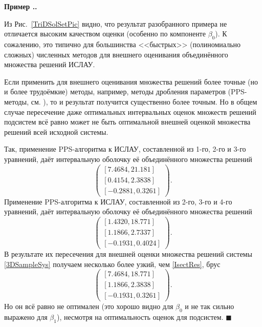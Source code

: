 \documentclass[a5paper,openany]{book}
\newcounter{ExmpNum}[section]
\renewcommand{\theExmpNum}{\thesection.\arabic{ExmpNum}}
\newenvironment{example}%
  {\refstepcounter{ExmpNum}%
  \par\addvspace{\medskipamount} 
  \noindent\textbf{Пример {\theExmpNum}.}
  }%
  {\hfill$\blacksquare$\par\medskip}
\begin{document}
\begin{example}
Из Рис.~\ref{TriDSolSetPic} видно, что результат разобранного примера не отличается 
высоким качеством оценки (особенно по компоненте $\beta_0$). К сожалению, это типично 
для большинства <<быстрых>> (полиномиально сложных) численных методов для внешнего 
оценивания объединённого множества решений ИСЛАУ. 
  
Если применить для внешнего оценивания множества решений более точные (но и более 
трудоёмкие) методы, например, методы дробления параметров (PPS-методы, см. 
\cite{SSharyBook}), то и результат получится существенно более точным. Но в общем 
случае пересечение даже оптимальных интервальных оценок множеств решений подсистем 
всё равно может не быть оптимальной внешней оценкой множества решений всей исходной 
системы. 
  
Так, применение PPS-алгоритма к ИСЛАУ, составленной из 1-го, 2-го и 3-го уравнений, 
даёт интервальную оболочку её объединённого множества решений 
\begin{equation*} 
\begin{pmatrix} 
[ 7.4684, 21.181] \\ 
[ 0.4154, 2.3838] \\ 
[-0.2881, 0.3261]
\end{pmatrix}.  
\end{equation*} 
Применение PPS-алгоритма к ИСЛАУ, составленной из 2-го, 3-го и 4-го уравнений, 
даёт интервальную оболочку её объединённого множества решений 
\begin{equation*} 
\begin{pmatrix} 
[ 1.4320, 18.771] \\ 
[ 1.1866, 2.7337] \\ 
[-0.1931, 0.4024] 
\end{pmatrix}.  
\end{equation*} 
В результате их пересечения для внешней оценки множества решений системы 
\eqref{3DSampleSys} получаем несколько более узкий, чем \eqref{IsectRes}, брус 
\begin{equation*} 
\begin{pmatrix} 
[ 7.4684, 18.771] \\
[ 1.1866, 2.3838] \\ 
[-0.1931, 0.3261] 
\end{pmatrix}. 
\end{equation*} 
Но он всё равно не оптимален (это хорошо видно для $\beta_0$ и не так сильно 
выражено для $\beta_1$), несмотря на оптимальность оценок для подсистем. 
\end{example} 
    
\end{document}
